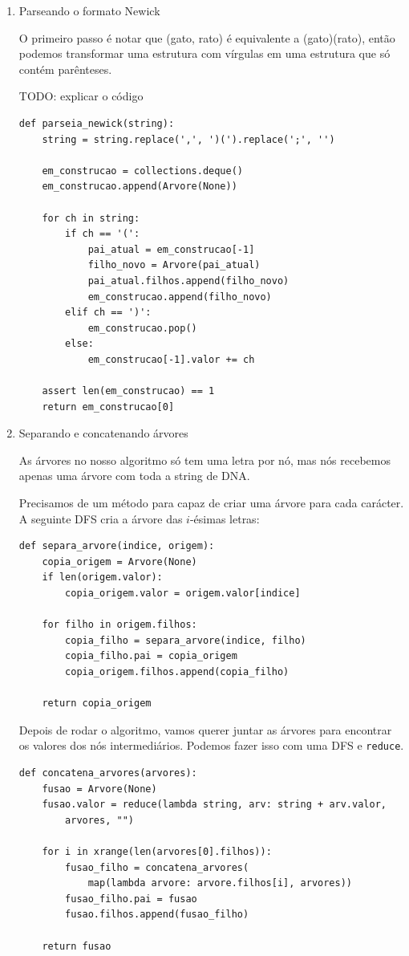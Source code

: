 \documentclass[11pt]{article}
\begin{document}
\begin{enumerate}
\item Parseando o formato Newick
\label{sec-2-3-1-1}

O primeiro passo é notar que (gato, rato) é equivalente a
(gato)(rato), então podemos transformar uma estrutura com vírgulas
em uma estrutura que só contém parênteses.

TODO: explicar o código
\begin{verbatim}
def parseia_newick(string):
    string = string.replace(',', ')(').replace(';', '')

    em_construcao = collections.deque()
    em_construcao.append(Arvore(None))

    for ch in string:
        if ch == '(':
            pai_atual = em_construcao[-1]
            filho_novo = Arvore(pai_atual)
            pai_atual.filhos.append(filho_novo)
            em_construcao.append(filho_novo)
        elif ch == ')':
            em_construcao.pop()
        else:
            em_construcao[-1].valor += ch

    assert len(em_construcao) == 1
    return em_construcao[0]
\end{verbatim}


\item Separando e concatenando árvores
\label{sec-2-3-1-2}

As árvores no nosso algoritmo só tem uma letra por nó, mas nós
recebemos apenas uma árvore com toda a string de DNA.

Precisamos de um método para capaz de criar uma árvore para cada
carácter. A seguinte DFS cria a árvore das $i$-ésimas letras:
\begin{verbatim}
def separa_arvore(indice, origem):
    copia_origem = Arvore(None)
    if len(origem.valor):
        copia_origem.valor = origem.valor[indice]

    for filho in origem.filhos:
        copia_filho = separa_arvore(indice, filho)
        copia_filho.pai = copia_origem
        copia_origem.filhos.append(copia_filho)

    return copia_origem
\end{verbatim}

Depois de rodar o algoritmo, vamos querer juntar as árvores para encontrar
os valores dos nós intermediários. Podemos fazer isso com uma DFS e \verb~reduce~.
\begin{verbatim}
def concatena_arvores(arvores):
    fusao = Arvore(None)
    fusao.valor = reduce(lambda string, arv: string + arv.valor,
        arvores, "")

    for i in xrange(len(arvores[0].filhos)):
        fusao_filho = concatena_arvores(
            map(lambda arvore: arvore.filhos[i], arvores))
        fusao_filho.pai = fusao
        fusao.filhos.append(fusao_filho)

    return fusao
\end{verbatim}
\end{enumerate}
\end{document}
